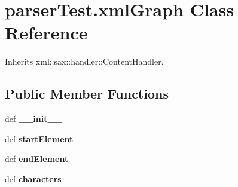\hypertarget{classparser_test_1_1xml_graph}{
\section{parserTest.xmlGraph Class Reference}
\label{classparser_test_1_1xml_graph}
}


Inherits xml::sax::handler::ContentHandler.

\subsection*{Public Member Functions}
\begin{DoxyCompactItemize}
\item 
\hypertarget{classparser_test_1_1xml_graph_a0d5265b609e50ac365c2b5df010003c0}{
def {\bfseries \_\-\_\-init\_\-\_\-}}
\label{classparser_test_1_1xml_graph_a0d5265b609e50ac365c2b5df010003c0}

\item 
\hypertarget{classparser_test_1_1xml_graph_addb273abe9697db0c77da5ecb88a1965}{
def {\bfseries startElement}}
\label{classparser_test_1_1xml_graph_addb273abe9697db0c77da5ecb88a1965}

\item 
\hypertarget{classparser_test_1_1xml_graph_a5afc9dd982ba120852d5c96aec405995}{
def {\bfseries endElement}}
\label{classparser_test_1_1xml_graph_a5afc9dd982ba120852d5c96aec405995}

\item 
\hypertarget{classparser_test_1_1xml_graph_ab50c14460e3bb2a73715c7d828e7618d}{
def {\bfseries characters}}
\label{classparser_test_1_1xml_graph_ab50c14460e3bb2a73715c7d828e7618d}

\end{DoxyCompactItemize}
